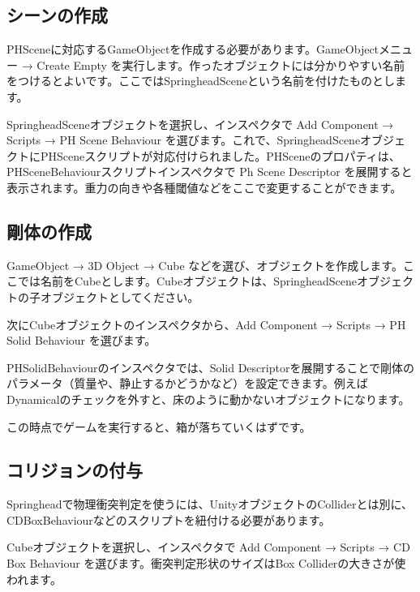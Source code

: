 \subsection{\KLUDGE シーンの作成}

PHScene\KLUDGE に対応するGameObject\KLUDGE を作成する必要があります。GameObject\KLUDGE メニュー \KLUDGE → Create Empty \KLUDGE を実行します。作ったオブジェクトには分かりやすい名前をつけるとよいです。ここではSpringheadScene\KLUDGE という名前を付けたものとします。

SpringheadScene\KLUDGE オブジェクトを選択し、インスペクタで Add Component \KLUDGE → Scripts \KLUDGE → PH Scene Behaviour \KLUDGE を選びます。これで、SpringheadScene\KLUDGE オブジェクトにPHScene\KLUDGE スクリプトが対応付けられました。PHScene\KLUDGE のプロパティは、PHSceneBehaviour\KLUDGE スクリプトインスペクタで Ph Scene Descriptor \KLUDGE を展開すると表示されます。重力の向きや各種閾値などをここで変更することができます。


\subsection{\KLUDGE 剛体の作成}

GameObject \KLUDGE → 3D Object \KLUDGE → Cube \KLUDGE などを選び、オブジェクトを作成します。ここでは名前をCube\KLUDGE とします。Cube\KLUDGE オブジェクトは、SpringheadScene\KLUDGE オブジェクトの子オブジェクトとしてください。

\KLUDGE 次にCube\KLUDGE オブジェクトのインスペクタから、Add Component \KLUDGE → Scripts \KLUDGE → PH Solid Behaviour \KLUDGE を選びます。

PHSolidBehaviour\KLUDGE のインスペクタでは、Solid Descriptor\KLUDGE を展開することで剛体のパラメータ（質量や、静止するかどうかなど）を設定できます。例えばDynamical\KLUDGE のチェックを外すと、床のように動かないオブジェクトになります。

\KLUDGE この時点でゲームを実行すると、箱が落ちていくはずです。


\subsection{\KLUDGE コリジョンの付与}

Springhead\KLUDGE で物理衝突判定を使うには、Unity\KLUDGE オブジェクトのCollider\KLUDGE とは別に、CDBoxBehaviour\KLUDGE などのスクリプトを紐付ける必要があります。

Cube\KLUDGE オブジェクトを選択し、インスペクタで Add Component \KLUDGE → Scripts \KLUDGE → CD Box Behaviour \KLUDGE を選びます。衝突判定形状のサイズはBox Collider\KLUDGE の大きさが使われます。

